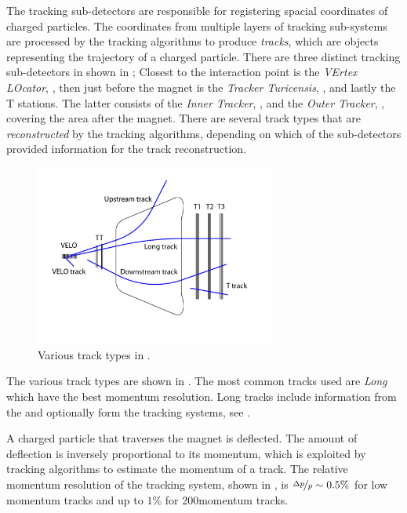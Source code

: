 The tracking sub-detectors are responsible for registering spacial coordinates of charged particles.
The coordinates from multiple layers of tracking sub-systems are processed by the tracking algorithms
to produce {\it tracks}, which are objects representing the trajectory of a charged particle. There are
three distinct tracking sub-detectors in \lhcb shown in ; Closest to the interaction point is
the {\it VErtex LOcator}, \velo, then just before the \lhcb magnet is the {\it Tracker Turicensis}, \ttracker,
and  lastly the T stations. The latter consists of the {\it Inner Tracker}, \intr, and the {\it Outer Tracker}, \ot,
covering the area after the \lhcb magnet. There are several track types that are {\it reconstructed} by
the tracking algorithms, depending on which of the sub-detectors provided information for
the track reconstruction.

\begin{figure}[h]
  \centering
  \includegraphics[width=0.7\textwidth]{Figures/Chapter2/trackTypesRunIAndII}
  \caption{Various track types in \lhcb.}
  \label{track_types}
\end{figure}

\noindent The various track types are shown in . The most common tracks used
are {\it Long} which have the best momentum resolution. Long tracks include information from the \velo and
optionally form the \ttracker tracking systems, see .

A charged particle that traverses the \lhcb magnet is deflected. The amount of deflection is inversely proportional
to its momentum, which is exploited by tracking algorithms to estimate the momentum of a track. The relative
momentum resolution of the tracking system, shown in , is $\nicefrac{\Delta p}{p} \sim 0.5 \%$
for low momentum tracks and up to $1\%$ for 200\gevc momentum tracks.

